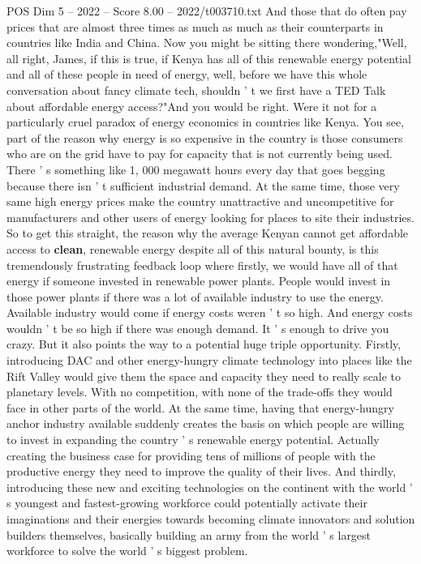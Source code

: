 \begin{textsample}{POS Dim 5 – 2022 – Score 8.00 – 2022/t003710.txt}
And those that do often pay prices that are almost three times as much as much as their counterparts in countries like India and China.
Now you might be sitting there wondering,"Well, all right, James, if this is true, if Kenya has all of this renewable energy potential and all of these people in need of energy, well, before we have this whole conversation about fancy climate tech, shouldn ' t we first have a TED Talk about affordable energy access?"And you would be right.
Were it not for a particularly cruel paradox of energy economics in countries like Kenya.
You see, part of the reason why energy is so expensive in the country is those consumers who are on the grid have to pay for capacity that is not currently being used.
There ' s something like 1, 000 megawatt hours every day that goes begging because there isn ' t sufficient industrial demand.
At the same time, those very same high energy prices make the country unattractive and uncompetitive for manufacturers and other users of energy looking for places to site their industries.
So to get this straight, the reason why the average Kenyan cannot get affordable access to \textbf{clean}, renewable energy despite all of this natural bounty, is this tremendously frustrating feedback loop where firstly, we would have all of that energy if someone invested in renewable power plants.
People would invest in those power plants if there was a lot of available industry to use the energy.
Available industry would come if energy costs weren ' t so high.
And energy costs wouldn ' t be so high if there was enough demand.
It ' s enough to drive you crazy.
But it also points the way to a potential huge triple opportunity.
Firstly, introducing DAC and other energy-hungry climate technology into places like the Rift Valley would give them the space and capacity they need to really scale to planetary levels.
With no competition, with none of the trade-offs they would face in other parts of the world.
At the same time, having that energy-hungry anchor industry available suddenly creates the basis on which people are willing to invest in expanding the country ' s renewable energy potential.
Actually creating the business case for providing tens of millions of people with the productive energy they need to improve the quality of their lives.
And thirdly, introducing these new and exciting technologies on the continent with the world ' s youngest and fastest-growing workforce could potentially activate their imaginations and their energies towards becoming climate innovators and solution builders themselves, basically building an army from the world ' s largest workforce to solve the world ' s biggest problem.

\end{textsample}
